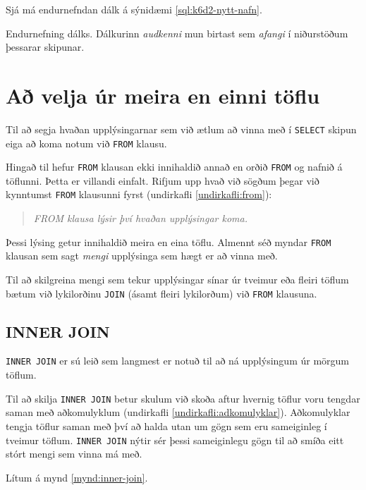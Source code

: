 Sjá má endurnefndan dálk á sýnidæmi \ref{sql:k6d2-nytt-nafn}.

\begin{example}
\caption[Endurnefning]{Endurnefning dálks. Dálkurinn \emph{audkenni} mun birtast sem \emph{afangi} í niðurstöðum þessarar skipunar.}
\label{sql:k6d2-nytt-nafn}
\centering
{}
\end{example}

\section{Að velja úr meira en einni töflu}
Til að segja hvaðan upplýsingarnar sem við ætlum að vinna með í \verb|SELECT| skipun eiga að koma notum við \verb|FROM| klausu.

Hingað til hefur \verb|FROM| klausan ekki innihaldið annað en orðið \verb|FROM| og nafnið á töflunni. Þetta er villandi einfalt. Rifjum upp hvað við sögðum þegar við kynntumst \verb|FROM| klausunni fyrst (undirkafli \ref{undirkafli:from}):
\begin{quote}
\emph{FROM klausa lýsir því hvaðan upplýsingar koma.}
\end{quote}
Þessi lýsing getur innihaldið meira en eina töflu. Almennt séð myndar \verb|FROM| klausan sem sagt \emph{mengi} upplýsinga sem hægt er að vinna með.

Til að skilgreina mengi sem tekur upplýsingar sínar úr tveimur eða fleiri töflum bætum við lykilorðinu \verb|JOIN| (ásamt fleiri lykilorðum) við \verb|FROM| klausuna.

\subsection{INNER JOIN}
\verb|INNER JOIN| er sú leið sem langmest er notuð til að ná upplýsingum úr mörgum töflum. 

Til að skilja \verb|INNER JOIN| betur skulum við skoða aftur hvernig töflur voru tengdar saman með aðkomulyklum (undirkafli \ref{undirkafli:adkomulyklar}).
Aðkomulyklar tengja töflur saman með því að halda utan um gögn sem eru sameiginleg í tveimur töflum. \verb|INNER JOIN| nýtir sér þessi sameiginlegu gögn til að smíða eitt stórt mengi sem vinna má með.

Lítum á mynd \ref{mynd:inner-join}.

